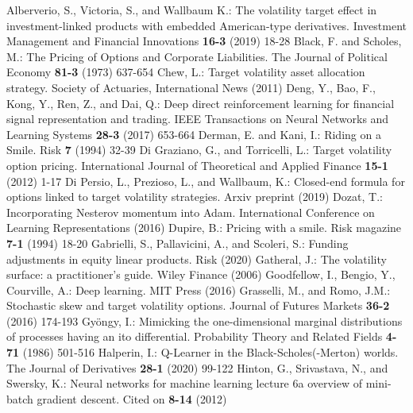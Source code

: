 \documentclass[runningheads]{m2ef}
\begin{document}
	\begin{thebibliography}{99}
	Alberverio, S., Victoria, S., and Wallbaum K.: The volatility target effect in investment-linked products with embedded American-type derivatives. Investment Management and Financial Innovations {\bf 16-3} (2019) 18-28
	Black, F. and Scholes, M.: The Pricing of Options and Corporate Liabilities. The Journal of Political Economy {\bf 81-3} (1973) 637-654
	Chew, L.: Target volatility asset allocation strategy. Society of Actuaries, International News (2011)
	Deng, Y., Bao, F., Kong, Y., Ren, Z., and Dai, Q.: Deep direct reinforcement learning for financial signal representation and trading. IEEE Transactions on Neural Networks and Learning Systems {\bf 28-3} (2017) 653-664 
	Derman, E. and Kani, I.: Riding on a Smile. Risk {\bf 7} (1994) 32-39
	Di Graziano, G., and Torricelli, L.: Target volatility option pricing. International Journal of Theoretical and Applied Finance {\bf 15-1} (2012) 1-17
	Di Persio, L.,  Prezioso, L., and Wallbaum, K.: Closed-end formula for options linked to target volatility strategies. Arxiv preprint (2019)
	Dozat, T.: Incorporating Nesterov momentum into Adam. International Conference on Learning Representations (2016)
	Dupire, B.: Pricing with a smile. Risk magazine {\bf 7-1} (1994) 18-20
	Gabrielli, S., Pallavicini, A., and Scoleri, S.: Funding adjustments in equity linear products. Risk (2020)
	Gatheral, J.: The volatility surface: a practitioner's guide. Wiley Finance (2006)
	Goodfellow, I., Bengio, Y., Courville, A.: Deep learning. MIT Press (2016)
	Grasselli, M., and Romo, J.M.: Stochastic skew and target volatility options. Journal of Futures Markets {\bf 36-2} (2016) 174-193
	Gy\"ongy, I.: Mimicking the one-dimensional marginal distributions of processes having an ito differential. Probability Theory and Related Fields {\bf 4-71} (1986) 501-516
	Halperin, I.: Q-Learner in the Black-Scholes(-Merton) worlds. The Journal of Derivatives {\bf 28-1} (2020) 99-122
	Hinton, G., Srivastava, N., and Swersky, K.: Neural networks for machine learning lecture 6a overview of mini-batch gradient descent. Cited on {\bf 8-14} (2012)

\end{thebibliography}
\end{document}
